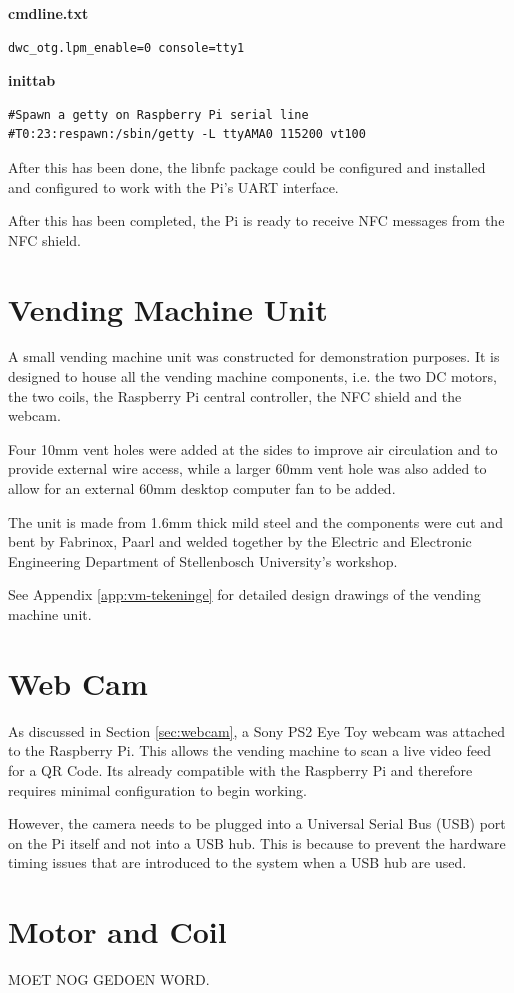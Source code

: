 \textbf{cmdline.txt}
\begin{verbatim}
dwc_otg.lpm_enable=0 console=tty1
\end{verbatim}

\textbf{inittab}
\begin{verbatim}
#Spawn a getty on Raspberry Pi serial line
#T0:23:respawn:/sbin/getty -L ttyAMA0 115200 vt100
\end{verbatim}

After this has been done, the libnfc package could be configured and installed
and configured to work with the Pi's UART interface.

After this has been completed, the Pi is ready to receive NFC messages from the
NFC shield.

\section{Vending Machine Unit}

A small vending machine unit was constructed for demonstration purposes. It is
designed to house all the vending machine components, i.e. the two DC motors,
the two coils, the Raspberry Pi central controller, the NFC shield and the
webcam.

 Four 10mm vent holes were added at the sides to improve air circulation
and to provide external wire access, while a larger 60mm vent hole was also
added to allow for an external 60mm desktop computer fan to be added. 

The unit is made from 1.6mm thick mild steel and the components were cut and
bent by Fabrinox, Paarl and welded together by the Electric and Electronic
Engineering Department of Stellenbosch University's workshop.

See Appendix \ref{app:vm-tekeninge} for detailed design drawings of the vending
machine unit.

\section{Web Cam}

As discussed in Section \ref{sec:webcam}, a Sony PS2 Eye Toy  webcam was
attached to the Raspberry Pi. This allows the vending machine to scan a live
video feed for a QR Code. Its already compatible with the Raspberry Pi and
therefore requires minimal configuration to begin working.

However, the camera needs to be plugged into a Universal Serial Bus (USB) port
on the Pi itself and not into a USB hub. This is because to prevent the
hardware timing issues that are introduced to the system when a USB hub are used. 

\section{Motor and Coil}

MOET NOG GEDOEN WORD.




